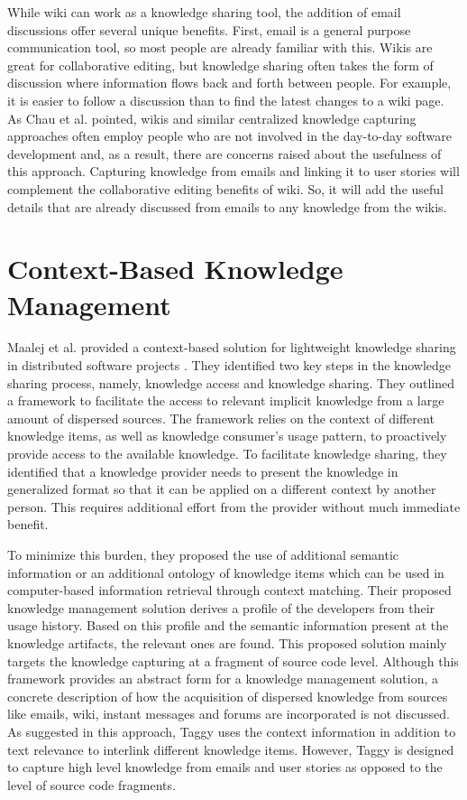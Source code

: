 While wiki can work as a knowledge sharing tool, the addition of email discussions offer several unique benefits. First, email is a general purpose communication tool, so most people are already familiar with this. Wikis are great for collaborative editing, but knowledge sharing often takes the form of discussion where information flows back and forth between people. For example, it is easier to follow a discussion than to find the latest changes to a  wiki page. As Chau et al. pointed, wikis and similar centralized knowledge capturing approaches often employ people who are not involved in the day-to-day software development and, as a result, there are concerns raised about the usefulness of this approach\cite{a_case_study_of_wiki}. Capturing knowledge from emails and linking it to user stories will complement the collaborative editing benefits of wiki. So, it will add the useful details that are already discussed from emails to any knowledge from the wikis.

\section{Context-Based Knowledge Management}
Maalej et al. provided a context-based solution for lightweight knowledge sharing in distributed software projects \cite{a_lightweight}. They identified two key steps in the knowledge sharing process, namely, knowledge access and knowledge sharing. They outlined a framework to facilitate the access to relevant implicit knowledge from a large amount of dispersed sources. The framework relies on the context of different knowledge items, as well as knowledge consumer's usage pattern, to proactively provide access to the available knowledge. To facilitate knowledge sharing, they identified that a knowledge provider needs to present the knowledge in generalized format so that it can be applied on a different context by another person. This requires additional effort from the provider without much immediate benefit.

To minimize this burden, they proposed the use of additional semantic information or an additional ontology of knowledge items which can be used in computer-based information retrieval through context matching. Their proposed knowledge management solution derives a profile of the developers from their usage history. Based on this profile and the semantic information present at the knowledge artifacts, the relevant ones are found. This proposed solution mainly targets the knowledge capturing at a fragment of source code level. Although this framework provides an abstract form for a knowledge management solution, a concrete description of how the acquisition of dispersed knowledge from sources like emails, wiki, instant messages and forums are incorporated is not discussed. As suggested in this approach, Taggy uses the context information in addition to text relevance to interlink different knowledge items. However, Taggy is designed to capture high level knowledge from emails and user stories as opposed to the level of source code fragments.

